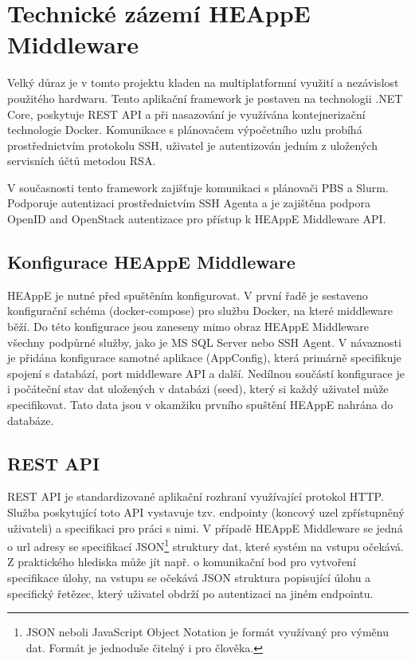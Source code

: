 \newpage
\section{Technické zázemí HEAppE Middleware}
Velký důraz je v tomto projektu kladen na multiplatformní využití a nezávislost použitého hardwaru. Tento aplikační framework je postaven na technologii .NET Core, poskytuje REST API a při nasazování je využívána kontejnerizační technologie Docker. Komunikace s plánovačem výpočetního uzlu probíhá prostřednictvím protokolu SSH, uživatel je autentizován jedním z uložených servisních účtů metodou RSA.

V současnosti tento framework zajišťuje komunikaci s plánovači PBS a Slurm. Podporuje autentizaci prostřednictvím SSH Agenta a je zajištěna podpora OpenID and OpenStack autentizace pro přístup k HEAppE Middleware API.

\subsection{Konfigurace HEAppE Middleware}
HEAppE je nutné před spuštěním konfigurovat. V první řadě je sestaveno konfigurační schéma (docker-compose) pro službu Docker, na které middleware běží. Do této konfigurace jsou zaneseny mimo obraz HEAppE Middleware všechny podpůrné služby, jako je MS SQL Server nebo SSH Agent. V návaznosti je přidána konfigurace samotné aplikace (AppConfig), která primárně specifikuje spojení s databází, port middleware API a další. Nedílnou součástí konfigurace je i počáteční stav dat uložených v databázi (seed), který si každý uživatel může specifikovat. Tato data jsou v okamžiku prvního spuštění HEAppE nahrána do databáze.

\subsection{REST API}
REST API je standardizované aplikační rozhraní využívající protokol HTTP. Služba poskytující toto API vystavuje tzv. endpointy (koncový uzel zpřístupněný uživateli) a specifikaci pro práci s nimi. V případě HEAppE Middleware se jedná o url adresy se specifikací JSON\footnote{JSON neboli JavaScript Object Notation je formát využívaný pro výměnu dat. Formát je jednoduše čitelný i pro člověka.\cite{lJoeVuQg92zsjaAe}} struktury dat, které systém na vstupu očekává. Z praktického hlediska může jít např. o komunikační bod pro vytvoření specifikace úlohy, na vstupu se očekává JSON struktura popisující úlohu a specifický řetězec, který uživatel obdrží po autentizaci na jiném endpointu.


